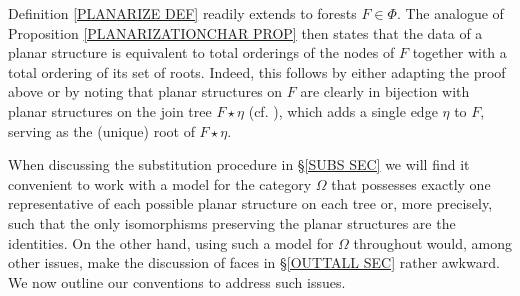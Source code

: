 \documentclass[a4paper,10pt]{article}%
\begin{document}
\begin{remark}\label{FORESTPLAN REM}
	Definition \ref{PLANARIZE DEF} readily extends to forests $F \in \Phi$. The analogue of Proposition \ref{PLANARIZATIONCHAR PROP} then states that the data of a planar structure is 
equivalent to total orderings of the nodes of $F$ together with a total ordering of its set of roots.
Indeed, this follows by either adapting the proof above or by noting that planar structures on $F$ are clearly in bijection with planar structures on the join tree $F \star \eta$ 
(cf. \cite[Def. 7.44]{Pe16b}), which adds a single edge $\eta$ to $F$, serving as the (unique) root of $F \star \eta$.
\end{remark}


When discussing the substitution procedure in \S \ref{SUBS SEC} we will find it convenient to work with a model for the category $\Omega$ that possesses exactly one representative of each possible planar structure on each tree or, more precisely, such that the only isomorphisms preserving the planar structures are the identities. On the other hand, using such a model for $\Omega$ throughout would, among other issues, make the discussion of faces in \S \ref{OUTTALL SEC} rather awkward.
We now outline our conventions to address such issues.
\end{document}
